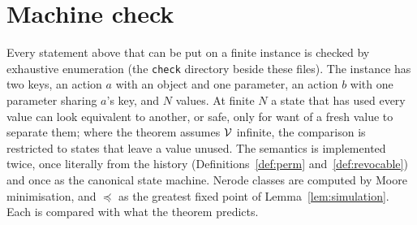 \section{Machine check}\label{sec:verification}

Every statement above that can be put on a finite instance is checked by exhaustive enumeration
(the \texttt{check} directory beside these files). The instance has two keys, an action $a$ with an object and one
parameter, an action $b$ with one parameter sharing $a$'s key, and $N$ values. At finite $N$ a state that has used every value can look equivalent to another, or safe, only for want of a fresh value to separate them; where the theorem assumes $\mathcal{V}$ infinite, the comparison is restricted to states that leave a value unused. The semantics is
implemented twice, once literally from the history (Definitions~\ref{def:perm}
and~\ref{def:revocable}) and once as the canonical state machine. Nerode classes are computed by
Moore minimisation, and $\preceq$ as the greatest fixed point of Lemma~\ref{lem:simulation}. Each
is compared with what the theorem predicts.

